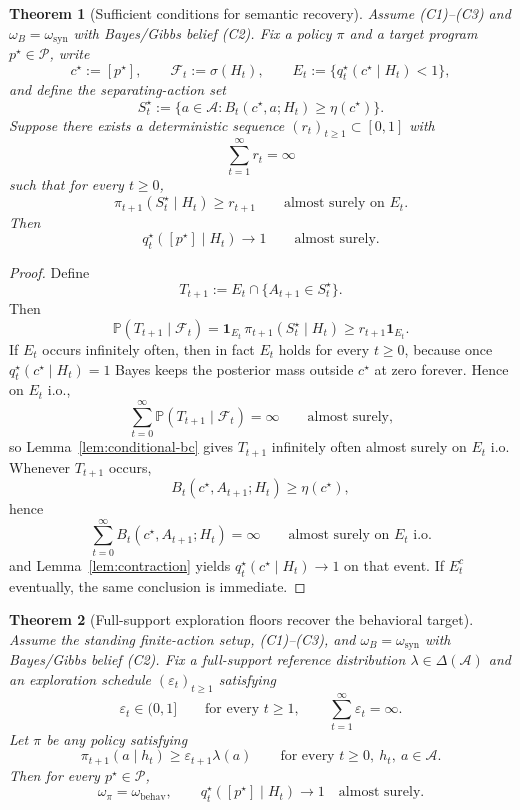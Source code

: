 \documentclass[11pt]{article}
\newtheorem{theorem}{Theorem}[section]
\theoremstyle{definition}
\theoremstyle{remark}
\newcommand{\Acal}{\mathcal{A}}
\newcommand{\Pcal}{\mathcal{P}}
\newcommand{\Prob}{\mathbb{P}}
\newcommand{\one}{\mathbf{1}}
\begin{document}
\begin{theorem}[Sufficient conditions for semantic recovery]
\label{thm:separating-support-convergence}
Assume \textup{(C1)--(C3)} and $\omega_B=\omega_{\mathrm{syn}}$ with Bayes/Gibbs belief \textup{(C2)}. Fix a policy $\pi$ and a target program $p^\star\in\Pcal$, write
\[
c^\star:=[p^\star],
\qquad
\mathcal F_t:=\sigma(H_t),
\qquad
E_t:=\{q_t^\star(c^\star\mid H_t)<1\},
\]
and define the separating-action set
\[
S_t^\star:=\{a\in\Acal:B_t(c^\star,a;H_t)\ge \eta(c^\star)\}.
\]
Suppose there exists a deterministic sequence $(r_t)_{t\ge 1}\subset[0,1]$ with
\[
\sum_{t=1}^\infty r_t=\infty
\]
such that for every $t\ge 0$,
\[
\pi_{t+1}(S_t^\star\mid H_t)\ge r_{t+1}
\qquad\text{almost surely on }E_t.
\]
Then
\[
q_t^\star([p^\star]\mid H_t)\longrightarrow 1
\qquad
\text{almost surely.}
\]
\end{theorem}

\begin{proof}
Define
\[
T_{t+1}:=E_t\cap\{A_{t+1}\in S_t^\star\}.
\]
Then
\[
\Prob(T_{t+1}\mid\mathcal F_t)
=
\one_{E_t}\,\pi_{t+1}(S_t^\star\mid H_t)
\ge
r_{t+1}\one_{E_t}.
\]
If $E_t$ occurs infinitely often, then in fact $E_t$ holds for every $t\ge 0$, because once $q_t^\star(c^\star\mid H_t)=1$ Bayes keeps the posterior mass outside $c^\star$ at zero forever. Hence on $E_t$ i.o.,
\[
\sum_{t=0}^\infty \Prob(T_{t+1}\mid\mathcal F_t)=\infty
\qquad\text{almost surely,}
\]
so Lemma~\ref{lem:conditional-bc} gives $T_{t+1}$ infinitely often almost surely on $E_t$ i.o. Whenever $T_{t+1}$ occurs,
\[
B_t(c^\star,A_{t+1};H_t)\ge \eta(c^\star),
\]
hence
\[
\sum_{t=0}^\infty B_t(c^\star,A_{t+1};H_t)=\infty
\qquad\text{almost surely on }E_t\text{ i.o.}
\]
and Lemma~\ref{lem:contraction} yields $q_t^\star(c^\star\mid H_t)\to 1$ on that event. If $E_t^c$ eventually, the same conclusion is immediate.
\end{proof}

\begin{theorem}[Full-support exploration floors recover the behavioral target]
\label{thm:exploration-floor-behavioral}
Assume the standing finite-action setup, \textup{(C1)--(C3)}, and $\omega_B=\omega_{\mathrm{syn}}$ with Bayes/Gibbs belief \textup{(C2)}. Fix a full-support reference distribution $\lambda\in\Delta(\Acal)$ and an exploration schedule $(\varepsilon_t)_{t\ge 1}$ satisfying
\[
\varepsilon_t\in(0,1]
\qquad\text{for every }t\ge 1,
\qquad
\sum_{t=1}^\infty \varepsilon_t=\infty.
\]
Let $\pi$ be any policy satisfying
\[
\pi_{t+1}(a\mid h_t)\ge \varepsilon_{t+1}\lambda(a)
\qquad
\text{for every }t\ge 0,\ h_t,\ a\in\Acal.
\]
Then for every $p^\star\in\Pcal$,
\[
\omega_\pi=\omega_{\mathrm{behav}},
\qquad
q_t^\star([p^\star]\mid H_t)\longrightarrow 1
\quad\text{almost surely.}
\]
\end{theorem}
\end{document}
